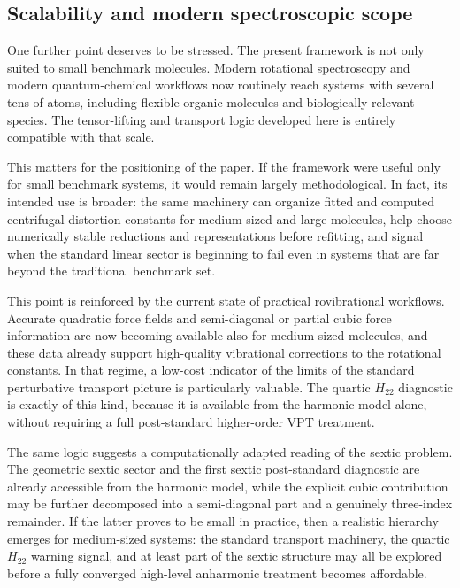 \documentclass[aip,jcp,reprint,floatfix]{revtex4-2}
\begin{document}
\subsection{Scalability and modern spectroscopic scope}

One further point deserves to be stressed. The present framework is not only
suited to small benchmark molecules. Modern rotational spectroscopy and modern
quantum-chemical workflows now routinely reach systems with several tens of
atoms, including flexible organic molecules and biologically relevant species.
The tensor-lifting and transport logic developed here is entirely compatible
with that scale.

This matters for the positioning of the paper. If the framework were useful
only for small benchmark systems, it would remain largely methodological. In
fact, its intended use is broader: the same machinery can organize fitted and
computed centrifugal-distortion constants for medium-sized and large
molecules, help choose numerically stable reductions and representations
before refitting, and signal when the standard linear sector is beginning to
fail even in systems that are far beyond the traditional benchmark set.

This point is reinforced by the current state of practical rovibrational
workflows. Accurate quadratic force fields and semi-diagonal or partial cubic
force information are now becoming available also for medium-sized molecules,
and these data already support high-quality vibrational corrections to the
rotational constants. In that regime, a low-cost indicator of the limits of
the standard perturbative transport picture is particularly valuable. The
quartic $H_{22}$ diagnostic is exactly of this kind, because it is available
from the harmonic model alone, without requiring a full post-standard higher-order VPT
treatment.

The same logic suggests a computationally adapted reading of the sextic
problem. The geometric sextic sector and the first sextic post-standard
diagnostic are already accessible from the harmonic model, while the explicit
cubic contribution may be further decomposed into a semi-diagonal part and a
genuinely three-index remainder. If the latter proves to be small in practice,
then a realistic hierarchy emerges for medium-sized systems: the standard
transport machinery, the quartic $H_{22}$ warning signal, and at least part of
the sextic structure may all be explored before a fully converged high-level
anharmonic treatment becomes affordable.
\end{document}
